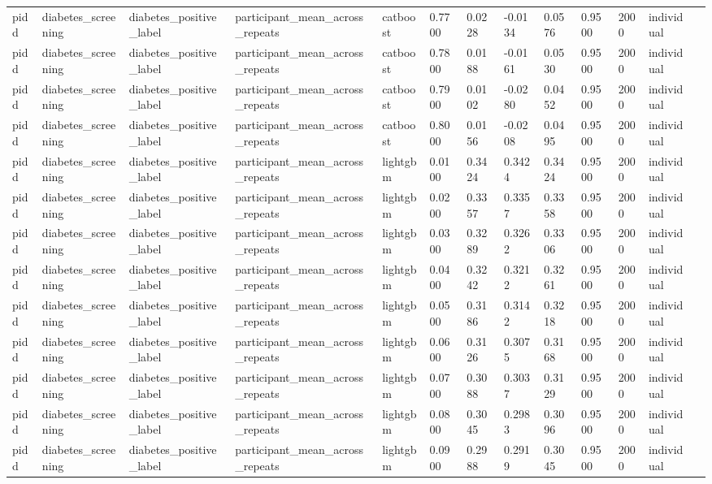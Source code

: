 \begin{tabular}{lllllllllllll}
pidd & diabetes\_screening & diabetes\_positive\_label & participant\_mean\_across\_repeats & catboost & 0.7700 & 0.0228 & -0.0134 & 0.0576 & 0.9500 & 2000 & individual &  \\
pidd & diabetes\_screening & diabetes\_positive\_label & participant\_mean\_across\_repeats & catboost & 0.7800 & 0.0188 & -0.0161 & 0.0530 & 0.9500 & 2000 & individual &  \\
pidd & diabetes\_screening & diabetes\_positive\_label & participant\_mean\_across\_repeats & catboost & 0.7900 & 0.0102 & -0.0280 & 0.0452 & 0.9500 & 2000 & individual &  \\
pidd & diabetes\_screening & diabetes\_positive\_label & participant\_mean\_across\_repeats & catboost & 0.8000 & 0.0156 & -0.0208 & 0.0495 & 0.9500 & 2000 & individual &  \\
pidd & diabetes\_screening & diabetes\_positive\_label & participant\_mean\_across\_repeats & lightgbm & 0.0100 & 0.3424 & 0.3424 & 0.3424 & 0.9500 & 2000 & individual &  \\
pidd & diabetes\_screening & diabetes\_positive\_label & participant\_mean\_across\_repeats & lightgbm & 0.0200 & 0.3357 & 0.3357 & 0.3358 & 0.9500 & 2000 & individual &  \\
pidd & diabetes\_screening & diabetes\_positive\_label & participant\_mean\_across\_repeats & lightgbm & 0.0300 & 0.3289 & 0.3262 & 0.3306 & 0.9500 & 2000 & individual &  \\
pidd & diabetes\_screening & diabetes\_positive\_label & participant\_mean\_across\_repeats & lightgbm & 0.0400 & 0.3242 & 0.3212 & 0.3261 & 0.9500 & 2000 & individual &  \\
pidd & diabetes\_screening & diabetes\_positive\_label & participant\_mean\_across\_repeats & lightgbm & 0.0500 & 0.3186 & 0.3142 & 0.3218 & 0.9500 & 2000 & individual &  \\
pidd & diabetes\_screening & diabetes\_positive\_label & participant\_mean\_across\_repeats & lightgbm & 0.0600 & 0.3126 & 0.3075 & 0.3168 & 0.9500 & 2000 & individual &  \\
pidd & diabetes\_screening & diabetes\_positive\_label & participant\_mean\_across\_repeats & lightgbm & 0.0700 & 0.3088 & 0.3037 & 0.3129 & 0.9500 & 2000 & individual &  \\
pidd & diabetes\_screening & diabetes\_positive\_label & participant\_mean\_across\_repeats & lightgbm & 0.0800 & 0.3045 & 0.2983 & 0.3096 & 0.9500 & 2000 & individual &  \\
pidd & diabetes\_screening & diabetes\_positive\_label & participant\_mean\_across\_repeats & lightgbm & 0.0900 & 0.2988 & 0.2919 & 0.3045 & 0.9500 & 2000 & individual &  \\

\end{tabular}
